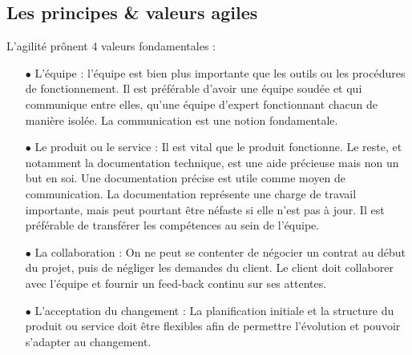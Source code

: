 \documentclass[12pt,a4paper]{article}
\begin{document}

\newpage
\subsection{Les principes \& valeurs agiles}

L'agilité prônent 4 valeurs fondamentales :

\begin{itemize}
\item[$\bullet$] L'équipe : l'équipe est bien plus importante que les outils ou les procédures de fonctionnement. Il est préférable d'avoir une équipe soudée et qui communique entre elles, qu'une équipe d'expert fonctionnant chacun de manière isolée. La communication est une notion fondamentale.\\

\item[$\bullet$] Le produit ou le service : Il est vital que le produit fonctionne. Le reste, et notamment la documentation technique, est une aide précieuse mais non un but en soi. Une documentation précise est utile comme moyen de communication. La documentation représente une charge de travail importante, mais peut pourtant être néfaste si elle n'est pas à jour. Il est préférable de transférer les compétences au sein de l’équipe.\\

\item[$\bullet$] La collaboration : On ne peut se contenter de négocier un contrat au début du projet, puis de négliger les demandes du client. Le client doit collaborer avec l'équipe et fournir un feed-back continu sur ses attentes.\\

\item[$\bullet$] L'acceptation du changement : La planification initiale et la structure du produit ou service doit être flexibles afin de permettre l'évolution et pouvoir s'adapter au changement.\\

\end{itemize}
\end{document}
